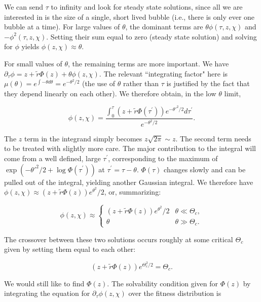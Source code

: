 \documentclass[10pt]{revtex4}
\begin{document}
We can send $\tau$ to infinity and look for steady state solutions, since all we are interested in is the size of a single, short lived bubble (i.e., there is only ever one bubble at a time).
For large values of $\theta$, the dominant terms are $\theta \phi(\tau,z,\chi)$ and $-\phi^2(\tau,z,\chi)$.
Setting their sum equal to zero (steady state solution) and solving for $\phi$ yields $\phi(z,\chi) \approx \theta$.

For small values of $\theta$, the remaining terms are more important.
We have $\partial_\tau \phi = z + \tilde{r} \Phi(z) + \theta \phi(z, \chi)$.
The relevant ``integrating factor" here is $\mu(\theta) = e^{\int -\theta d\theta} = e^{-\theta^2/2}$ (the use of $\theta$ rather than $\tau$ is justified by the fact that they depend linearly on each other).
We therefore obtain, in the low $\theta$ limit,

\begin{equation}
\phi(z,\chi) = \frac{\int_0^\tau (z+\tilde{r}\Phi(\tau^\prime)) e^{-{\theta'}^2/2} d\tau^\prime}{e^{-\theta^2/2}}.
\end{equation}

The $z$ term in the integrand simply becomes $z\sqrt{2\pi} \sim z$.
The second term needs to be treated with slightly more care.
The major contribution to the integral will come from a well defined, large $\tau^\prime$, corresponding to the maximum of $\exp(-\theta'^2/2 + \log \Phi(\tau^\prime))$ at $\tau^\prime = \tau - \theta$.
$\Phi(\tau)$ changes slowly and can be pulled out of the integral, yielding another Gaussian integral.
We therefore have $\phi(z,\chi) \approx (z+\tilde{r}\Phi(z))e^{\theta^2}/2$, or, summarizing:

\begin{equation}
\phi(z,\chi) \approx
\begin{cases}
(z+\tilde{r}\Phi(z))e^{\theta^2}/2 & \theta \ll \Theta_c, \\
\theta & \theta \gg \Theta_c.
\end{cases}
\end{equation}


The crossover between these two solutions occurs roughly at some critical $\Theta_c$ given by setting them equal to each other: 

\begin{equation}
(z+\tilde{r}\Phi(z))e^{\Theta_c^2/2} = \Theta_c.
\end{equation}

We would still like to find $\Phi(z)$. The solvability condition given for $\Phi(z)$ by integrating the equation for $\partial_\tau \phi(z,\chi)$ over the fitness distribution is
\end{document}
